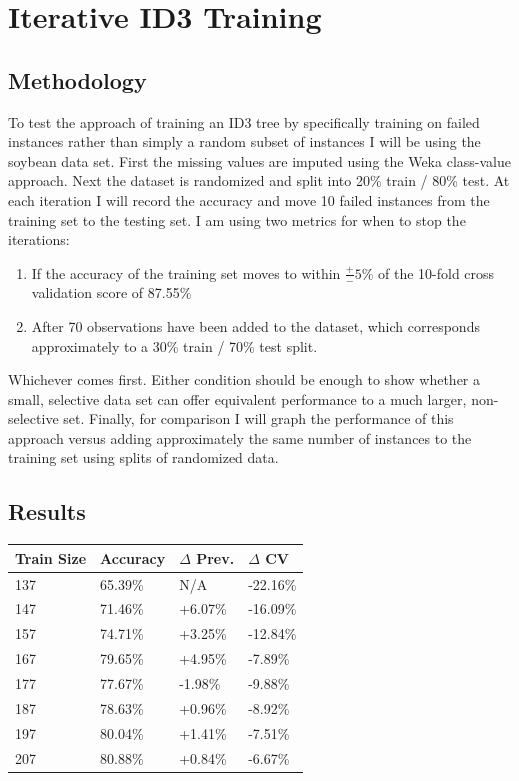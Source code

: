 \documentclass[11pt, letterpaper]{report}
\begin{document}
\section{Iterative ID3 Training}

\subsection{Methodology}

To test the approach of training an ID3 tree by specifically training on failed instances rather than simply a random subset of instances I will be using the soybean data set. First the missing values are imputed using the Weka class-value approach. Next the dataset is randomized and split into 20\% train / 80\% test. At each iteration I will record the accuracy and move 10 failed instances from the training set to the testing set. I am using two metrics for when to stop the iterations:

\begin{enumerate}
    \item{If the accuracy of the training set moves to within $\frac{+}{-}5\%$ of the 10-fold cross validation score of 87.55\%}
    \item{After 70 observations have been added to the dataset, which corresponds approximately to a 30\% train / 70\% test split.}
\end{enumerate}

Whichever comes first. Either condition should be enough to show whether a small, selective data set can offer equivalent performance to a much larger, non-selective set. Finally, for comparison I will graph the performance of this approach versus adding approximately the same number of instances to the training set using splits of randomized data.

\subsection{Results}

\begin{tabular}{ |l|l|l|l| }
    \hline
    \textbf{Train Size} & \textbf{Accuracy} & \textbf{$\Delta$ Prev.} & \textbf{$\Delta$ CV} \\ \hline
    137 & 65.39\% & N/A & -22.16\% \\
    147 & 71.46\% & +6.07\% & -16.09\% \\
    157 & 74.71\% & +3.25\% & -12.84\% \\
    167 & 79.65\% & +4.95\% & -7.89\% \\
    177 & 77.67\% & -1.98\% & -9.88\% \\
    187 & 78.63\% & +0.96\% & -8.92\% \\
    197 & 80.04\% & +1.41\% & -7.51\% \\
    207 & 80.88\% & +0.84\% & -6.67\% \\
    \hline
\end{tabular}
\end{document}
